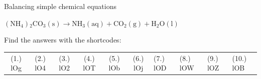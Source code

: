\begin{exercises}{ Balancing simple chemical equations
        }
\begin{enumerate}[noitemsep, label=\textbf{\arabic*}. ]
$\left({\mathrm{NH}}_{4}\right){}_{2}{\mathrm{CO}}_{3}\left(\mathrm{s}\right)\to {\mathrm{NH}}_{3}\left(\mathrm{aq}\right)+{\mathrm{CO}}_{2}\left(\mathrm{g}\right)+\mathrm{H}{}_{2}\mathrm{O}\left(\mathrm{l}\right)$\hspace{1ex}        \end{enumerate}
  \label{m38726**end}
\par {} Find the answers with the shortcodes:
 \par \begin{tabular}[h]{cccccc}
 (1.) lOg  &  (2.) lO4  &  (3.) lO2  &  (4.) lOT  &  (5.) lOb  &  (6.) lOj  &  (7.) lOD  &  (8.) lOW  &  (9.) lOZ  &  (10.) lOB  & \end{tabular}
\end{exercises}
